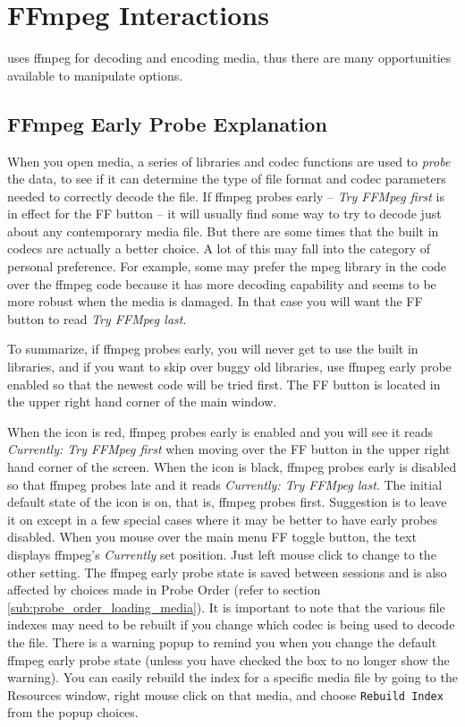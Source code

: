 \chapter{FFmpeg Interactions}%
\label{cha:ffmpeg_interactions}

\CGG{} uses ffmpeg for decoding and encoding media, thus there are many opportunities available to manipulate options.

\section{FFmpeg Early Probe Explanation}%
\label{sec:ffmpeg_early_probe_explanation}

When you open media, a series of libraries and codec functions are used to \textit{probe} the data, to see if it can determine the type of file format and codec parameters needed to correctly decode the file.  If ffmpeg probes early -- \textit{Try FFMpeg first} is in effect for the FF button -- it will usually find some way to try to decode just about any contemporary media file.  But there are some times that the built in codecs are actually a better choice.  A lot of this may fall into the category of personal preference.  For example, some may prefer the mpeg library in the \CGG{} code over the ffmpeg code because it has more decoding capability and seems to be more robust when the media is damaged.  In that case you will want the FF button to read \textit{Try FFMpeg last}.

To summarize, if ffmpeg probes early, you will never get to use the built in libraries, and if you want to skip over buggy old libraries, use ffmpeg early probe enabled so that the newest code will be tried first.
The FF button is located in the upper right hand corner of the main window.

When the icon is red, ffmpeg probes early is enabled and you will see it reads
 \textit{Currently: Try FFMpeg first} when moving over the FF button in the upper 
right hand corner of the screen.  When the icon is black, ffmpeg probes early is disabled so that 
ffmpeg probes late and it reads \textit{Currently: Try FFMpeg last}.  The initial default state of 
the icon is on, that is, ffmpeg probes first. Suggestion is to leave it on except in a few special 
cases where it may be better to have early probes disabled.  When you mouse over the main menu FF 
toggle button, the text displays ffmpeg's \textit{Currently} set position.  Just left mouse click to change to the other setting.
The ffmpeg early probe state is saved between sessions and is also affected by choices made in Probe Order (refer to section \ref{sub:probe_order_loading_media}). It is important to note that the various file indexes may need to be rebuilt if you change which codec is being used to decode the file.  There is a warning popup to remind you when you change the default ffmpeg early probe state (unless you have checked the box to no longer show the warning).  You can easily rebuild the index for a specific media file by going to the Resources window, right mouse click on that media, and choose \texttt{Rebuild Index} from the popup choices.

